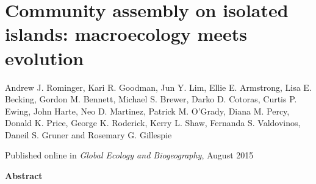 \chapter{Community assembly on isolated islands: macroecology meets
  evolution}

{\large Andrew J. Rominger, Kari R. Goodman, Jun Y. Lim, Ellie
  E. Armstrong, Lisa E. Becking, Gordon M. Bennett, Michael S. Brewer,
  Darko D. Cotoras, Curtis P. Ewing, John Harte, Neo D. Martinez,
  Patrick M. O'Grady, Diana M. Percy, Donald K. Price, George
  K. Roderick, Kerry L. Shaw, Fernanda S. Valdovinos, Daneil S. Gruner
  and Rosemary G. Gillespie}
\vspace{3.5em}

\noindent
Published online in \textit{Global Ecology and Biogeography}, August 2015

\clearpage

\noindent
\textbf{Abstract}
\vspace{\baselineskip}


